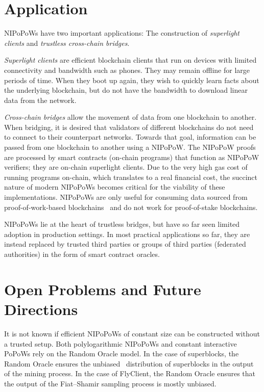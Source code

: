 \documentclass[runningheads]{format/llncs}
\begin{document}
\section*{Application}
NIPoPoWs have two important applications: The construction of \emph{superlight clients} and \emph{trustless cross-chain bridges}.

\emph{Superlight clients} are efficient blockchain clients that run on devices with limited connectivity and bandwidth such as phones. They may remain offline for large periods of time. When they boot up again, they wish to quickly learn facts about the underlying blockchain, but do not have the bandwidth to download linear data from the network.

\emph{Cross-chain bridges} allow the movement of data from one blockchain to another. When bridging, it is desired that validators of different blockchains do not need to connect to their counterpart networks. Towards that goal, information can be passed from one blockchain to another using a NIPoPoW. The NIPoPoW proofs are processed by smart contracts (on-chain programs) that function as NIPoPoW verifiers; they are on-chain superlight clients. Due to the very high gas cost of running programs on-chain, which translates to a real financial cost, the succinct nature of modern NIPoPoWs becomes critical for the viability of these implementations. NIPoPoWs are only useful for consuming data sourced from proof-of-work-based blockchains~\cite{pow-sidechains} and do not work for proof-of-stake blockchains.

NIPoPoWs lie at the heart of trustless bridges, but have so far seen limited adoption in production settings. In most practical applications so far, they are instead replaced by trusted third parties or groups of third parties (federated authorities) in the form of smart contract oracles.

\section*{Open Problems and Future Directions}
It is not known if efficient NIPoPoWs of constant size can be constructed without a trusted setup. Both polylogarithmic NIPoPoWs and constant interactive PoPoWs rely on the Random Oracle model. In the case of superblocks, the Random Oracle ensures the unbiased~\cite{compactsuperblocks} distribution of superblocks in the output of the mining process. In the case of FlyClient, the Random Oracle ensures that the output of the Fiat--Shamir sampling process is mostly unbiased.
\end{document}
